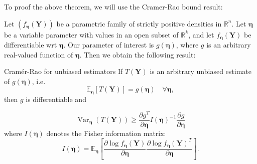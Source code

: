 \documentclass[11pt, %
	oneside, %
	english, %
	onehalfspacing, %
	]{article} %
\numberwithin{equation}{section}
\begin{document}
To proof the above theorem, we will use the Cramer-Rao bound result:

Let $\left(f_{\mathbf{\eta}}(\mathbf{Y})\right)$ be a parametric family of strictly positive densities in $\mathbb{R}^n$. Let $\mathbf{\eta}$ be a variable parameter with values in an open subset of $\mathbb{R}^k$, and let $f_{\mathbf{\eta}}(\mathbf{Y})$ be differentiable wrt $\mathbf{\eta}$. Our parameter of interest is $g(\mathbf{\eta})$, where $g$ is an arbitrary real-valued function of $\mathbf{\eta}$. Then we obtain the following result:

\begin{theorem}{Cramér-Rao for unbiased estimators}{}
    If $T(\mathbf{Y})$ is an arbitrary unbiased estimate of $g(\mathbf{\eta})$, i.e.
    $$
    \mathbb{E}_{\mathbf{\eta}}[T(\mathbf{Y})]=g(\mathbf{\eta}) \quad \forall \mathbf{\eta},
    $$
    then $g$ is differentiable and

    \begin{equation}\label{eq:cramerrao_proof_to}
        \operatorname{Var}_{\mathbf{\eta}}(T(\mathbf{Y})) \geq \frac{\partial g^T}{\partial \mathbf{\eta}} I(\mathbf{\eta})^{-1} \frac{\partial g}{\partial \mathbf{\eta}}
    \end{equation}
    where $I(\mathbf{\eta})$ denotes the Fisher information matrix:
    \begin{equation*}
        I(\mathbf{\eta})=\mathbb{E}_{\mathbf{\eta}}\left[\frac{\partial \log f_{\mathbf{\eta}}(\mathbf{Y})}{\partial \mathbf{\eta}} \frac{\partial \log f_{\mathbf{\eta}}(\mathbf{Y})^T}{\partial \mathbf{\eta}}\right] .
    \end{equation*}
\end{theorem}
\end{document}
